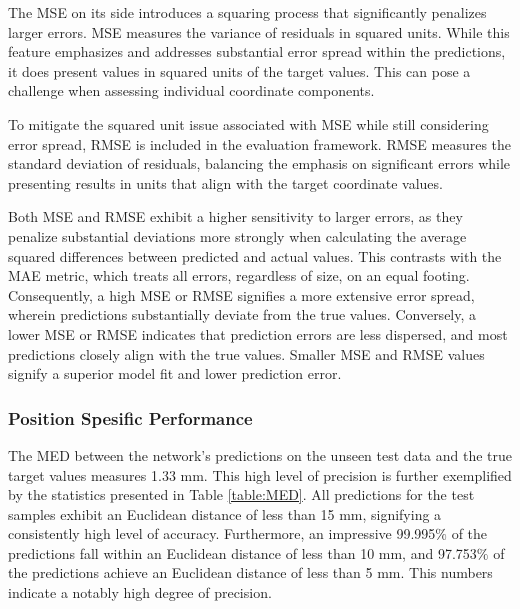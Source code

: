 \documentclass[a4paper, UKenglish, 11pt]{uiomaster}
\begin{document}
The MSE on its side introduces a squaring process that significantly penalizes larger errors. MSE measures the variance of residuals in squared units. While this feature emphasizes and addresses substantial error spread within the predictions, it does present values in squared units of the target values. This can pose a challenge when assessing individual coordinate components.

To mitigate the squared unit issue associated with MSE while still considering error spread, RMSE is included in the evaluation framework. RMSE measures the standard deviation of residuals, balancing the emphasis on significant errors while presenting results in units that align with the target coordinate values.

Both MSE and RMSE exhibit a higher sensitivity to larger errors, as they penalize substantial deviations more strongly when calculating the average squared differences between predicted and actual values. This contrasts with the MAE metric, which treats all errors, regardless of size, on an equal footing. Consequently, a high MSE or RMSE signifies a more extensive error spread, wherein predictions substantially deviate from the true values. Conversely, a lower MSE or RMSE indicates that prediction errors are less dispersed, and most predictions closely align with the true values. Smaller MSE and RMSE values signify a superior model fit and lower prediction error.


\subsubsection{Position Spesific Performance}
The MED between the network's predictions on the unseen test data and the true target values measures 1.33 mm. This high level of precision is further exemplified by the statistics presented in Table \ref{table:MED}. All predictions for the test samples exhibit an Euclidean distance of less than 15 mm, signifying a consistently high level of accuracy. Furthermore, an impressive 99.995$\%$ of the predictions fall within an Euclidean distance of less than 10 mm, and 97.753$\%$ of the predictions achieve an Euclidean distance of less than 5 mm. This numbers indicate a notably high degree of precision.
\end{document}
